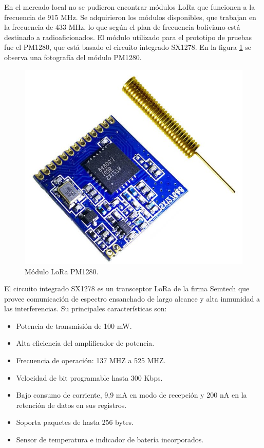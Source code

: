 En el mercado local no se pudieron encontrar módulos LoRa que funcionen a la frecuencia de 915 MHz. Se adquirieron los módulos disponibles, que trabajan en la frecuencia de 433 MHz, lo que según el plan de frecuencia boliviano \citep{WEBSITE:17} está destinado a radioaficionados. El módulo utilizado para el prototipo de pruebas fue el PM1280, que está basado el circuito integrado SX1278. En la figura \ref{fig:loraModule} se observa una fotografía del módulo PM1280.

\begin{figure}[h]
	\centering
	\includegraphics[scale=0.2]{./Figures/pm1280.jpg}
	\caption{Módulo LoRa PM1280\protect\footnotemark.}
		\label{fig:loraModule}
\end{figure}


El circuito integrado SX1278 es un transceptor LoRa de la firma Semtech que provee comunicación de espectro ensanchado de largo alcance y alta inmunidad a las interferencias. Su principales características son:

\begin{itemize}
	\item Potencia de transmisión de 100 mW.
	\item Alta eficiencia del amplificador de potencia.
	\item Frecuencia de operación: 137 MHZ a 525 MHZ.
	\item Velocidad de bit programable hasta 300 Kbps.
	\item Bajo consumo de corriente, 9,9 mA en modo de recepción y 200 nA en la retención de datos en sus registros.
	\item Soporta paquetes de hasta 256 bytes.
	\item Sensor de temperatura e indicador de batería incorporados.
\end{itemize}


